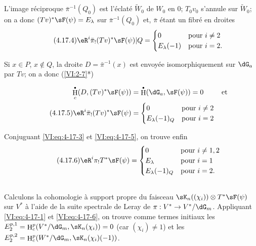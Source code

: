 \documentclass[oneside]{book}
\DeclareMathOperator{\h}{H}
\theoremstyle{sga-source}
\theoremstyle{sga-source-dash}
\theoremstyle{sga-source-dotdash}
\theoremstyle{sga-source-number-note-dash}
\theoremstyle{sga-source-note-number-dotdash}
\theoremstyle{sga-source-example-dotdash}
\theoremstyle{sga-source-inline-number}
\theoremstyle{sga-source-bare-number}
\theoremstyle{sga-source}
\let\oldbullet\bullet
\renewcommand{\bullet}{\textnormal{\tiny$\oldbullet$}}
\newcommand{\PrintPage}[1]{}\newcommand{\MathPage}[1]{}\newcommand{\PrintCite}[2]{#1}\newcommand{\var}[3]{#2}
\begin{document}
L'image réciproque $\bar\pi^{-1}(Q_0)$ est l'éclaté $\widetilde W_0$ de 
$W_0$ en $0$; \var{$T_0 V_0$ s'annule}{$T_0 v_0$ s'annule}{S45-SOL-0849} sur $\widetilde W_0$; on a donc 
$(T v)^\ast \sF(\psi)=E_\lambda$ \var{sur $\pi^{-1}(Q_0)$}{sur $\bar\pi^{-1}(Q_0)$}{S45-SOL-0850} et, $\bar\pi$ étant un 
fibré en droites 
\begin{equation*}\tag{4.17.4}\label{VI:eq:4-17-4}
  \eR^i \bar\pi_! (T v)^\ast \sF(\psi)|Q = 
    \begin{cases}
      0 & \text{pour $i\ne 2$} \\
      E_\lambda(-1) & \text{pour $i=2$.} 
    \end{cases} 
\end{equation*}

Si $x\in P$, $x\notin Q$, la droite \var{$D=\pi^{-1}(x)$}{$D=\bar\pi^{-1}(x)$}{S45-SOL-0851} \var{est envoyé}{est envoyée}{S45-SOL-0852} 
isomorphiquement sur $\dG_a$ par $T v$; on a donc 
(\ref{VI:2-7}*) 
\PrintPage{206}
\begin{align} \notag 
  \h_c^\bullet(D,(T v)^\ast \sF(\psi)) &= \h^\bullet(\dG_a,\sF(\psi)) = 0 && \text{et} \\
  \tag{4.17.5}\label{VI:eq:4-17-5}
  \eR^i \bar\pi_! (T v)^\ast \sF(\psi) 
    &= \begin{cases} 
         0 & \text{pour $i\ne 2$} \\
         E_\lambda(-1)_Q & \text{pour $i=2$} 
       \end{cases} 
\end{align}

Conjuguant \eqref{VI:eq:4-17-3} et \eqref{VI:eq:4-17-5}, on trouve enfin 
\begin{equation*}\tag{4.17.6}\label{VI:eq:4-17-6}
  \eR^i \pi_! T^\ast\sF(\psi) = 
    \begin{cases}
      0 & \text{pour $i\ne 1,2$} \\
      E_\lambda & \text{pour $i=1$} \\
      E_\lambda(-1)_Q & \text{pour $i=2$.} 
    \end{cases}
\end{equation*}





\subsection{}\label{VI:4-18}

Calculons la cohomologie à support propre du faisceau 
$\sK_n((\chi_i))\otimes T^\ast \sF(\psi)$ sur $V^\ast$ à l'aide de la suite 
spectrale de Leray de $\pi:V^\ast\to V^\ast/\dG_m$. Appliquant 
\eqref{VI:eq:4-17-1} et \eqref{VI:eq:4-17-6}, on trouve comme termes initiaux 
les $E_2^{p,1} = \h_c^p(V^\ast/\dG_m,\sK_n(\chi_i)) = 0$ (car $(\chi_i)\ne 1$) 
et les $E_2^{p,2} = \h_c^p(W^\ast/\dG_m,\sK_n(\chi_i)(-1))$. 
\end{document}
